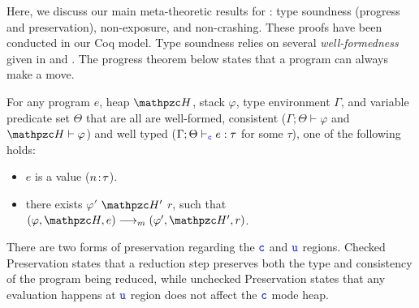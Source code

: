 
Here, we discuss our main meta-theoretic results for
\lang: type soundness (progress and preservation),
non-exposure, and non-crashing.
These proofs have been conducted in our Coq model.
Type soundness relies on several \emph{well-formedness} given in \cite{li22checkedc} and .
The progress theorem below states that a \lang program can always make a move.

\begin{thm}[Progress]\label{thm:progress}

For any \lang program $e$, heap $\heap$, stack
$\varphi$, type environment $\Gamma$, and variable predicate set $\Theta$
that are all are well-formed, consistent
($\Gamma;\Theta\vdash \varphi$ and $\heap \vdash \varphi$) and well
typed ($\Gamma;\Theta\vdash_{\textcolor{blue}{\texttt{c}}} e : \tau$ for some $\tau$),
one of the following holds:

\begin{itemize}

\item $e$ is a value (${n}\!:\!{\tau}$).

\item there exists $\varphi'$ $\heap'$ $r$, such that $(\varphi,\heap,e) \longrightarrow_m (\varphi',\heap',r)$.

\end{itemize}
\end{thm}

\noindent
There are two forms of preservation regarding the $\textcolor{blue}{\texttt{c}}$ and $\textcolor{blue}{\texttt{u}}$ regions.
Checked Preservation states that a reduction step preserves both the
type and consistency of the program being reduced, while
unchecked Preservation states that any evaluation happens at $\textcolor{blue}{\texttt{u}}$ region does not affect the $\textcolor{blue}{\texttt{c}}$ mode heap.

